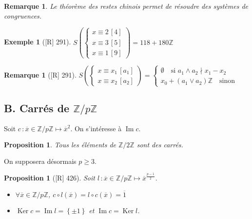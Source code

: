 \documentclass[10pt, a4paper, parskip=full, twoside, twocolumn]{report}
\newtheorem{proposition}[definition]{Proposition}
\newtheorem{example}[definition]{Exemple}
\newtheorem{remark}[definition]{Remarque}
\newcommand{\IZ}{\mathbb{Z}}
\DeclareMathOperator{\im}{Im}
\DeclareMathOperator{\Ker}{Ker}
\begin{document}
\begin{remark}
	Le théorème des restes chinois permet de résoudre des systèmes de congruences.
\end{remark}


\begin{tcolorbox}[
    breakable, %
    colback=developpement, %
    colframe=gray!0!black, %
    boxrule=0pt, %
    arc=1mm, %
	boxsep=0pt,
	left=0pt, right=0pt, top=0pt, bottom=0pt
]
\begin{example}[\textnormal{[R] 291}]
	\label{120dev12}
	$S\left(\begin{cases}
		x\equiv 2\,[4] \\
		x\equiv 3\,[5] \\
		x\equiv 1\,[9]
	\end{cases}\right) = 118 + 180\IZ$
\end{example}
\end{tcolorbox}

\begin{remark}[\textnormal{[R] 291}]
	$S\left(\begin{cases}
		x\equiv x_1\,[a_1] \\
		x\equiv x_2\,[a_2]
	\end{cases}\right) =\begin{cases}
		\emptyset\quad\text{si } a_1\wedge a_2 \nmid x_1-x_2 \\
		x_0 + (a_1\vee a_2)\IZ\quad\text{sinon}
	\end{cases}$
\end{remark}

\subsection*{B. Carrés de $\IZ/p\IZ$}
Soit $c\,\colon \overline{x}\in\IZ/p\IZ \mapsto \overline{x}^2$.
On s'intéresse à $\im c$.

\begin{proposition}
	Tous les éléments de $\IZ/2\IZ$ sont des carrés.
\end{proposition}
On supposera désormais $p\geq 3$.

\begin{proposition}[\textnormal{[R] 426}]
	Soit $l\,\colon \overline{x}\in\IZ/p\IZ \mapsto \overline{x}^{\frac{p-1}{2}}$.
	\begin{itemize}
		\item $\forall \overline{x}\in\IZ/p\IZ$, $c\circ l(\overline{x}) = l\circ c(\overline{x}) = \overline{1}$
		\item $\Ker c = \im l =\left\{\pm 1\right\}$ et $\im c = \Ker l$.
	\end{itemize}
\end{proposition}
\end{document}
